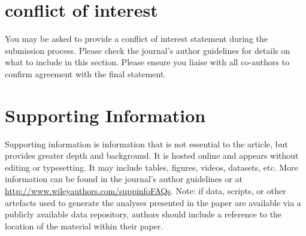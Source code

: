 \documentclass[num-refs]{wiley-article}
\begin{document}
\section*{conflict of interest}
You may be asked to provide a conflict of interest statement during the submission process. Please check the journal's author guidelines for details on what to include in this section. Please ensure you liaise with all co-authors to confirm agreement with the final statement.

\section*{Supporting Information}

Supporting information is information that is not essential to the article, but provides greater depth and background. It is hosted online and appears without editing or typesetting. It may include tables, figures, videos, datasets, etc. More information can be found in the journal's author guidelines or at \url{http://www.wileyauthors.com/suppinfoFAQs}. Note: if data, scripts, or other artefacts used to generate the analyses presented in the paper are available via a publicly available data repository, authors should include a reference to the location of the material within their paper.

\printendnotes




\end{document}
